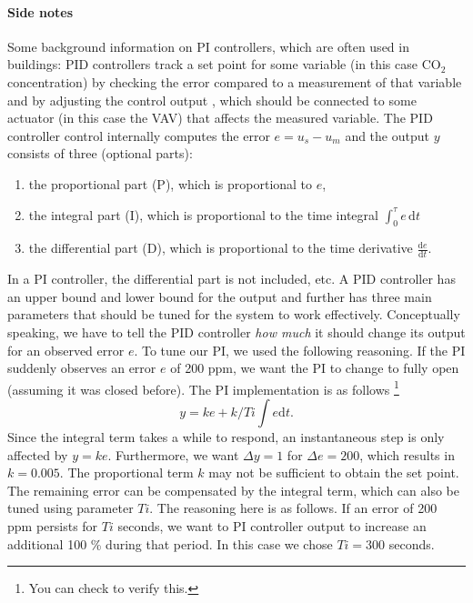 \documentclass[10pt,a4paper]{article}
\begin{document}
\paragraph{Side notes}
Some background information on PI controllers, 
which are often used in buildings: 
PID controllers track a set point for some variable (in this case CO$_2$ concentration)  
by checking the error compared to a measurement of that variable 
and by adjusting the control output , which should be connected
to some actuator (in this case the VAV) that affects the measured variable.
The PID controller control internally computes the error $e=u_s-u_m$
and the output $y$ consists of three (optional parts): 
\begin{enumerate}
\item the proportional part (P), which is proportional to $e$,
\item the integral part (I), which is proportional to the time integral $\int_0^\tau e \, \mathrm{d}t$
\item the differential part (D), which is proportional to the time derivative $\frac{ \mathrm{d} e}{ \mathrm{d} t}$.
\end{enumerate}
In a PI controller, the differential part is not included, etc.
A PID controller has an upper bound and lower bound for the output 
and further has three main parameters that should be tuned
for the system to work effectively.
Conceptually speaking, we have to tell the PID controller \textit{how much} it
should change its output for an observed error $e$.
To tune our PI, we used the following reasoning.
If the PI suddenly observes an error $e$ of 200 ppm,
we want the PI to change to fully open (assuming it was closed before).
The PI implementation is as follows 
\footnote{You can check  to verify this.}
\begin{equation}
y = ke + k/Ti\int e\mathrm{d}t.
\end{equation}
Since the integral term takes a while to respond,
an instantaneous step is only affected by $y=ke$.
Furthermore, we want $\Delta y = 1$  for $\Delta e = 200$,
which results in $k=0.005$.
The proportional term $k$ may not be sufficient
to obtain the set point. 
The remaining error can be compensated by the integral term, 
which can also be tuned using parameter $Ti$.
The reasoning here is as follows.
If an error of 200 ppm persists for $Ti$ seconds,
we want to PI controller output to increase an additional 100 \% 
during that period.
In this case we chose $Ti=300$ seconds.
\end{document}
